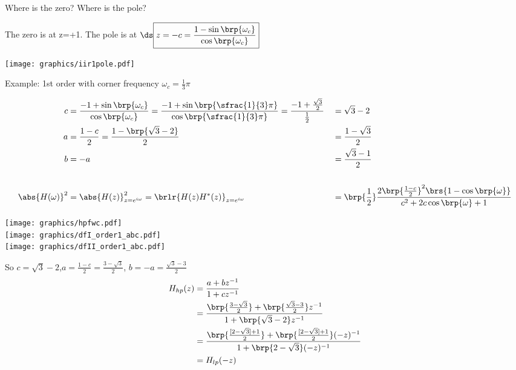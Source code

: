 
Where is the zero? Where is the pole?

The zero is at z=+1. \qquad The pole is at 
$\ds\boxed{z=-c = \frac{1 - \sin\brp{\omega_c}}
                    {\cos\brp{\omega_c}}}$

\texttt{[image: graphics/iir1pole.pdf]}


Example: 1st order  with corner frequency $\omega_c=\frac{1}{3}\pi$

{ \begin{align*}
  c &= \frac{-1 + \sin\brp{\omega_c}}{\cos\brp{\omega_c}}
     = \frac{-1 + \sin\brp{\sfrac{1}{3}\pi}}{\cos\brp{\sfrac{1}{3}\pi}}
     = \frac{-1 + \frac{\sqrt{3}}{2}}{\frac{1}{2}}
   &&= \sqrt{3} - 2
  \\
  a &= \frac{1-c}{2}
     = \frac{1-\brp{\sqrt{3} - 2}}{2}
   &&= \frac{1-\sqrt{3}}{2}
  \\
  b &= -a
   &&= \frac{\sqrt{3} - 1}{2}
  \\
  \\
  \abs{H(\omega)}^2
    &= \abs{H(z)}^2_{z=e^{i\omega}}
     = \brlr{H(z)H^\ast(z)}_{z=e^{i\omega}}
   &&= \brp{\frac{1}{2}}\frac{2\brp{\frac{1-c}{2}}^2\brs{1 -  \cos\brp{\omega}}}
            {c^2 + 2 c\cos\brp{\omega} + 1}
\end{align*}}


\texttt{[image: graphics/hpfwc.pdf]}\\
\texttt{[image: graphics/dfI\_order1\_abc.pdf]}\\
\texttt{[image: graphics/dfII\_order1\_abc.pdf]}



So $c=\sqrt{3}-2$,\qquad $a=\frac{1-c}{2}=\frac{3-\sqrt{3}}{2}$, \qquad $b=-a=\frac{\sqrt{3}-3}{2}$
\begin{align*}
  H_{hp}(z)
    &= \frac{a + bz^{-1}}{1+cz^{-1}}
  \\&= \frac{\brp{\frac{3-\sqrt{3}}{2}} + \brp{\frac{\sqrt{3}-3}{2}}z^{-1}}
            {1+\brp{\sqrt{3}-2}z^{-1}}
  \\&= \frac{\brp{\frac{[2-\sqrt{3}]+1}{2}} + \brp{\frac{[2-\sqrt{3}]+1}{2}}(-z)^{-1}}
            {1+\brp{2-\sqrt{3}}(-z)^{-1}}
  \\&= H_{lp}(-z)
\end{align*}



